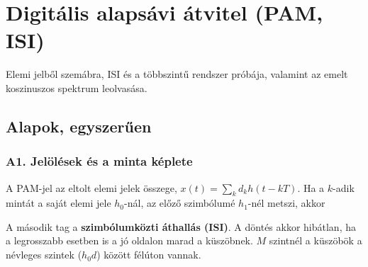 \setcounter{chapter}{2}
\chapter{\texorpdfstring{Digitális alapsávi átvitel (PAM, ISI)}{Digitális alapsávi átvitel (PAM, ISI)}}\label{f3}
Elemi jelből szemábra, ISI és a többszintű rendszer próbája, valamint az emelt koszinuszos spektrum leolvasása.

\section{Alapok, egyszerűen}
\subsection{\texorpdfstring{A1. Jelölések és a minta képlete}{A1. Jelölések és a minta képlete}}\label{b3-jel}
\par{}\par

A PAM-jel az eltolt elemi jelek összege, $x(t)=\sum_kd_kh(t-kT)$. Ha a $k$-adik mintát a saját elemi jele $h_0$-nál, az előző szimbólumé $h_1$-nél metszi, akkor

\begin{center}\end{center}

A második tag a \textbf{szimbólumközti áthallás (ISI)}. A döntés akkor hibátlan, ha a legrosszabb esetben is a jó oldalon marad a küszöbnek. $M$ szintnél a küszöbök a névleges szintek ($h_0d$) között félúton vannak.

